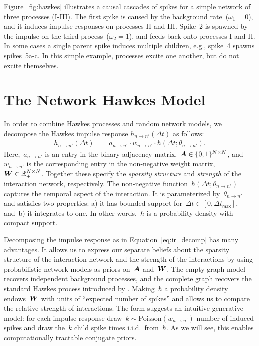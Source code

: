 Figure~\ref{fig:hawkes} illustrates a causal cascades of spikes for a
simple network of three processes (I-III).  The first spike is caused
by the background rate~(${\omega_1=0}$), and it induces impulse responses
on processes II and III. Spike~2 is spawned by the impulse on the
third process~(${\omega_2=1}$), and feeds back onto processes I and II. In
some cases a single parent spike induces multiple children, e.g.,
spike~4 spawns spikes~{5a-c}. In this simple example, processes excite
one another, but do not excite themselves.

\section{The Network Hawkes Model}
\label{sec:network_hawkes_model}
In order to combine Hawkes processes and random network models, we
decompose the Hawkes impulse response $h_{n \to n'}(\Delta t)$ as
follows:
\begin{align}
\label{eq:ir_decomp}
h_{n \to n'}(\Delta t) &= a_{n \to n'} \cdot w_{n \to n'} \cdot \hbar(\Delta t; \theta_{n \to n'}).
\end{align}
Here,~$a_{n \to n'}$ is an entry in the binary adjacency
matrix,~${\boldsymbol{A}\in\{0,1\}^{N \times N}}$,
and~$w_{n \to n'}$ is the corresponding entry in the non-negative
weight matrix,~${\boldsymbol{W} \in\mathbb{R}_+^{N\times N}}$. Together these specify
the \emph{sparsity structure} and \emph{strength} of the interaction
network, respectively. The non-negative function~${\hbar(\Delta t;
  \theta_{n \to n'})}$ captures the temporal aspect of the
interaction. It is parameterized by~${\theta_{n \to n'}}$ and
satisfies two properties: a) it has bounded support for~${\Delta t \in
  [0,\Delta t_{\mathsf{max}}]}$, and~b) it integrates to one. In other
words,~$\hbar$ is a probability density with compact support.

Decomposing the impulse response as in Equation~\ref{eq:ir_decomp} has
many advantages. It allows us to express our separate beliefs about
the sparsity structure of the interaction network and the strength of
the interactions by using probabilistic network models as priors
on~$\boldsymbol{A}$ and~$\boldsymbol{W}$.  The empty graph model recovers independent
background processes, and the complete graph recovers the standard
Hawkes process introduced by \citet{Hawkes-1971}.  Making~$\hbar$ a
probability density endows~$\boldsymbol{W}$ with units of ``expected number of
spikes'' and allows us to compare the relative strength of
interactions. The form suggests an intuitive generative model: for
each impulse response draw~${k \sim \text{Poisson}(w_{n \to n'})}$
number of induced spikes and draw the~$k$ child spike times
i.i.d.\ from~$\hbar$.  
As we will see, this enables computationally
tractable conjugate priors.

